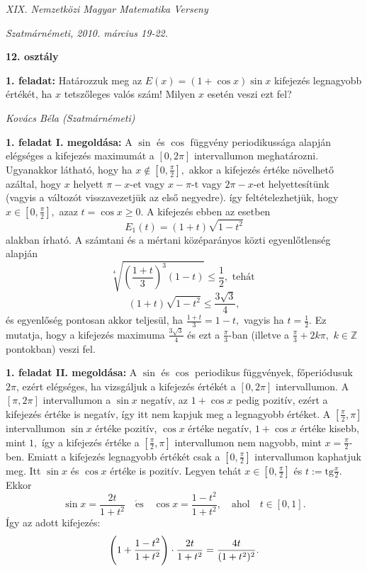 \documentclass[a4paper,10pt]{article}
\def\ki#1#2{\hfill {\it #1 (#2)}\medskip}
\begin{document}
\begin{center} \Large {\em XIX. Nemzetközi Magyar Matematika Verseny} \end{center}
\begin{center} \large{\em Szatmárnémeti, 2010. március 19-22.} \end{center}
\smallskip
\begin{center} \large{\bf 12. osztály} \end{center}
\bigskip 

{\bf 1. feladat: } Határozzuk meg az $E(x)=(1+\cos{x})\sin{x}$ kifejezés legnagyobb
értékét, ha $x$ tetszőleges valós szám! Milyen $x$ esetén veszi ezt
fel?

\ki{Kovács Béla}{Szatmárnémeti}\medskip

\textbf{1. feladat I. megoldása: } A $\sin$ és $\cos$ függvény
periodikussága alapján elég\-séges a kifejezés maximumát
a $[0,2\pi]$ intervallumon meghatá\-rozni. Ugyanakkor látható,
hogy ha $x\not \in \left [0,\frac{\pi}{2}\right ],$ akkor a
kifejezés értéke növelhető azáltal, hogy $x$ helyett
$\pi-x$-et vagy $x-\pi$-t vagy $2\pi-x$-et helyettesítünk
(vagyis a változót visszavezetjük az első ne\-gyed\-re).
így feltételezhetjük, hogy $x\in \left [0,\frac{\pi}{2}\right
],$ azaz $t=\cos x\geq 0.$ A kifejezés ebben az esetben
$$E_1(t)=(1+t)\sqrt{1-t^2}$$ alakban írható. A számtani és a
mértani középarányos közti egyenlőtlenség
alapján
$$\sqrt[4]{\left(\frac{1+t}{3}\right )^3(1-t)}\leq \frac{1}{2},\mbox{ tehát }$$
 $$(1+t)\sqrt{1-t^2}\leq \frac{3\sqrt{3}}{4},$$ és egyenl\H
oség pontosan akkor teljesül, ha $\frac{1+t}{3}=1-t,$ vagyis ha
$t=\frac 12.$ Ez mutatja, hogy a kifejezés maximuma
$\frac{3\sqrt{3}}{4}$ és ezt a $\frac{\pi}{3}$-ban (illetve a
$\frac{\pi}{3}+2k\pi,$ $k\in \mathbb{Z}$ pontokban) veszi fel.

\medskip

\textbf{1. feladat II. megoldása: } A $\sin$ és $\cos$ periodikus függvények, főperiódusuk $2\pi$, ezért
elégséges, ha vizsgáljuk a kifejezés értékét a $[0,2\pi]$
intervallumon. A $[\pi,2\pi]$ intervallumon a $\sin{x}$ negatív, az
$1+\cos{x}$ pedig pozitív, ezért a kifejezés értéke is negatív, így
itt nem kapjuk meg a legnagyobb értéket. A $[\frac{\pi}{2},\pi]$
intervallumon $\sin{x}$ értéke po\-zi\-tív, $\cos{x}$ értéke
negatív, $1+\cos{x}$ értéke kisebb, mint $1,$ így a kifejezés
értéke a $[\frac{\pi}{2},\pi]$ intervallumon nem nagyobb, mint
$x=\frac{\pi}{2}$-ben. Emiatt a kifejezés legnagyobb értékét csak a
$[0,\frac{\pi}{2}]$ intervallumon kap\-hat\-juk meg. Itt $\sin{x}$
és $\cos{x}$ értéke is pozitív. Legyen tehát $x\in[0,\frac{\pi}{2}]$
és $t:=\mathrm{tg}\frac{x}{2}$. Ekkor
\[\sin{x}=\frac{2t}{1+t^2} \quad\mathrm{\acute{e}s}\quad \cos{x}=\frac{1-t^2}{1+t^2},\quad \mathrm{ahol} \quad t\in[0,1]. \]
Így az adott kifejezés:
\[\Bigg{(}1+\frac{1-t^2}{1+t^2}\Bigg{)}\cdot\frac{2t}{1+t^2}=\frac{4t}{(1+t^2)^2}.\]
\end{document}
